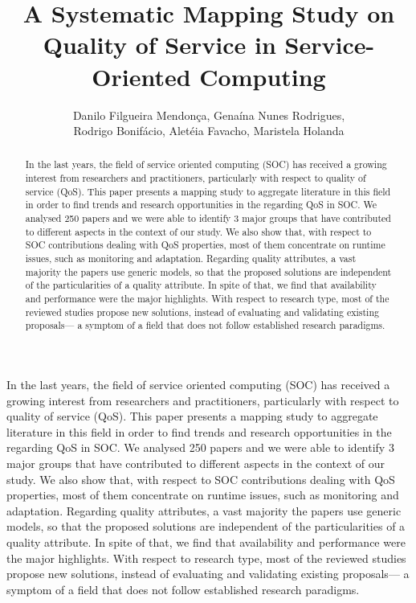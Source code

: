 \documentclass[12pt]{article}
\title{A Systematic Mapping Study on Quality of Service in Service-Oriented Computing}
\author{Danilo Filgueira Mendon\c{c}a\inst{1}, Gena\'{i}na Nunes Rodrigues\inst{1}, \\ Rodrigo Bonif\'{a}cio\inst{1}, Alet\'{e}ia Favacho\inst{1}, Maristela Holanda\inst{1} }
\begin{document}
 

\maketitle

\begin{abstract}
  In the last years, the field of service oriented computing (SOC) has received a growing interest from researchers and practitioners, particularly with respect to quality of service (QoS). This paper presents a mapping study to aggregate literature in this field in order to find trends and research opportunities in the regarding QoS in SOC. We analysed 250 papers and we were able to identify 3 major groups that have contributed to different aspects in the context of our study. We also show that, with respect to SOC contributions dealing with QoS properties, most of them concentrate on runtime issues, such as monitoring and adaptation. Regarding quality attributes, a vast majority the papers use generic models, so that the proposed solutions are independent of the particularities of a quality attribute. In spite of that, we find that availability and performance were the major highlights. With respect to research type, most of the reviewed studies propose new solutions, instead of evaluating and validating existing proposals--- a symptom of a field that does not follow established research paradigms.
\end{abstract}

\begin{resumo}
In the last years, the field of service oriented computing (SOC) has received a growing interest from researchers and practitioners, particularly with respect to quality of service (QoS). This paper presents a mapping study to aggregate literature in this field in order to find trends and research opportunities in the regarding QoS in SOC. We analysed 250 papers and we were able to identify 3 major groups that have contributed to different aspects in the context of our study. We also show that, with respect to SOC contributions dealing with QoS properties, most of them concentrate on runtime issues, such as monitoring and adaptation. Regarding quality attributes, a vast majority the papers use generic models, so that the proposed solutions are independent of the particularities of a quality attribute. In spite of that, we find that availability and performance were the major highlights. With respect to research type, most of the reviewed studies propose new solutions, instead of evaluating and validating existing proposals--- a symptom of a field that does not follow established research paradigms.
\end{resumo}




    











\end{document}
